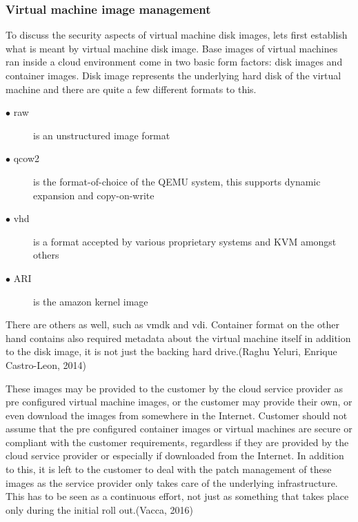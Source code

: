 \documentclass{article}
\begin{document}
\subsubsection{Virtual machine image management}
To discuss the security aspects of virtual machine disk images, lets first establish what is meant by virtual machine disk image.
Base images of virtual machines ran inside a cloud environment come in two basic form factors: disk images and container images. Disk image represents the underlying hard disk of the virtual machine and there are quite a few different formats to this.
\begin{description}
	\item[$\bullet$ raw] is an unstructured image format
	\item[$\bullet$ qcow2] is the format-of-choice of the QEMU system, this supports dynamic expansion and copy-on-write
	\item[$\bullet$ vhd] is a format accepted by various proprietary systems and KVM amongst others
	\item[$\bullet$ ARI] is the amazon kernel image
\end{description}
There are others as well, such as vmdk and vdi. Container format on the other hand contains also required metadata about the virtual machine itself in addition to the disk image, it is not just the backing hard drive.(Raghu Yeluri, Enrique Castro-Leon, 2014)
\par
These images may be provided to the customer by the cloud service provider as pre configured virtual machine images, or the customer may provide their own, or even download the images from somewhere in the Internet. Customer should not assume that the pre configured container images or virtual machines are secure or compliant with the customer requirements, regardless if they are provided by the cloud service provider or especially if downloaded from the Internet. In addition to this, it is left to the customer to deal with the patch management of these images as the service provider only takes care of the underlying infrastructure. This has to be seen as a continuous effort, not just as something that takes place only during the initial roll out.(Vacca, 2016)
\end{document}
